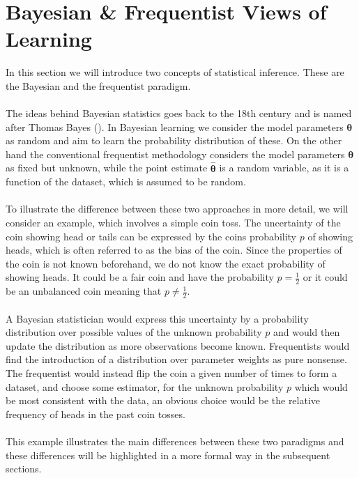 \section{Bayesian \& Frequentist Views of Learning}\label{sec:bayesian_stat}
In this section we will introduce two concepts of statistical inference. These are the Bayesian and the frequentist paradigm.
\\
\\
The ideas behind Bayesian statistics goes back to the 18th century and is named after Thomas Bayes (\cite{stigler1986history}). In Bayesian learning we consider the model parameters $\boldsymbol{\theta}$ as random and aim to learn the probability distribution of these. On the other hand the conventional frequentist methodology considers the model parameters $\boldsymbol{\theta}$ as fixed but unknown, while the point estimate $\hat{\boldsymbol{\theta}}$ is a random variable, as it is a function of the dataset, which is assumed to be random.
\\
\\
To illustrate the difference between these two approaches in more detail, we will consider an example, which involves a simple coin toss. The uncertainty of the coin showing head or tails can be expressed by the coins probability $p$ of showing heads, which is often referred to as the bias of the coin. Since the properties of the coin is not known beforehand, we do not know the exact probability of showing heads. It could be a fair coin and have the probability $p=\frac{1}{2}$ or it could be an unbalanced coin meaning that $p\neq \frac{1}{2}$.
\\
\\
A Bayesian statistician would express this uncertainty by a probability distribution over possible values of the unknown probability $p$ and would then update the distribution as more observations become known. Frequentists would find the introduction of a distribution over parameter weights as pure nonsense. The frequentist would instead flip the coin a given number of times to form a dataset, and choose some estimator, for the unknown probability $p$ which would be most consistent with the data, an obvious choice would be the relative frequency of heads in the past coin tosses. 
\\
\\
This example illustrates the main differences between these two paradigms and these differences will be highlighted in a more formal way in the subsequent sections.



